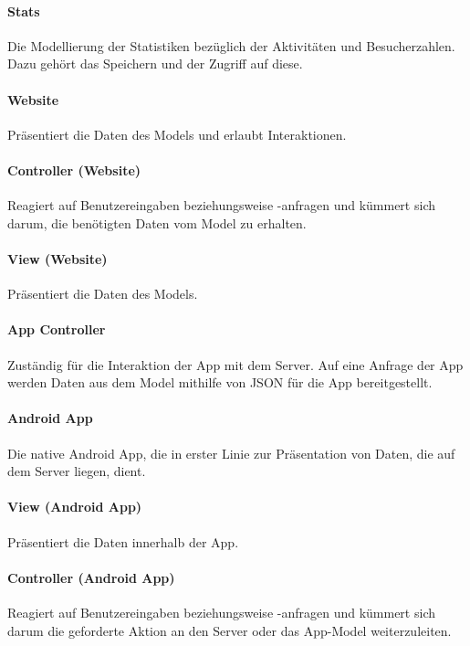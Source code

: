 \paragraph{Stats} Die Modellierung der Statistiken bezüglich der Aktivitäten und Besucherzahlen. Dazu gehört das Speichern und der Zugriff auf diese.

\paragraph{Website} Präsentiert die Daten des Models und erlaubt Interaktionen.

\paragraph{Controller (Website)} Reagiert auf Benutzereingaben beziehungsweise -anfragen und kümmert sich darum, die benötigten Daten vom Model zu erhalten.

\paragraph{View (Website)} Präsentiert die Daten des Models.

\paragraph{App Controller} Zuständig für die Interaktion der App mit dem Server. Auf eine Anfrage der App werden Daten aus dem Model mithilfe von JSON für die App bereitgestellt.

\paragraph{Android App} Die native Android App, die in erster Linie zur Präsentation von Daten, die auf dem Server liegen, dient.

\paragraph{View (Android App)} Präsentiert die Daten innerhalb der App.

\paragraph{Controller (Android App)} Reagiert auf Benutzereingaben beziehungsweise -anfragen und kümmert sich darum die geforderte Aktion an den Server oder das App-Model weiterzuleiten.

